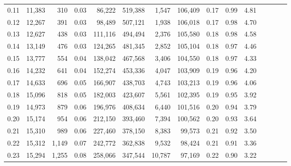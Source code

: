 \begin{tabular}{rrrcrrrrrrrrrrr}
0.11 &  11,383 &    310 &                                       0.03 &   86,222 &  519,388 &    1,547 &  106,409 &  0.17 &  0.99 &                         4.81 \\
0.12 &  12,267 &    391 &                                       0.03 &   98,489 &  507,121 &    1,938 &  106,018 &  0.17 &  0.98 &                         4.70 \\
0.13 &  12,627 &    438 &                                       0.03 &  111,116 &  494,494 &    2,376 &  105,580 &  0.18 &  0.98 &                         4.58 \\
0.14 &  13,149 &    476 &                                       0.03 &  124,265 &  481,345 &    2,852 &  105,104 &  0.18 &  0.97 &                         4.46 \\
0.15 &  13,777 &    554 &                                       0.04 &  138,042 &  467,568 &    3,406 &  104,550 &  0.18 &  0.97 &                         4.33 \\
0.16 &  14,232 &    641 &                                       0.04 &  152,274 &  453,336 &    4,047 &  103,909 &  0.19 &  0.96 &                         4.20 \\
0.17 &  14,633 &    696 &                                       0.05 &  166,907 &  438,703 &    4,743 &  103,213 &  0.19 &  0.96 &                         4.06 \\
0.18 &  15,096 &    818 &                                       0.05 &  182,003 &  423,607 &    5,561 &  102,395 &  0.19 &  0.95 &                         3.92 \\
0.19 &  14,973 &    879 &                                       0.06 &  196,976 &  408,634 &    6,440 &  101,516 &  0.20 &  0.94 &                         3.79 \\
0.20 &  15,174 &    954 &                                       0.06 &  212,150 &  393,460 &    7,394 &  100,562 &  0.20 &  0.93 &                         3.64 \\
0.21 &  15,310 &    989 &                                       0.06 &  227,460 &  378,150 &    8,383 &   99,573 &  0.21 &  0.92 &                         3.50 \\
0.22 &  15,312 &  1,149 &                                       0.07 &  242,772 &  362,838 &    9,532 &   98,424 &  0.21 &  0.91 &                         3.36 \\
0.23 &  15,294 &  1,255 &                                       0.08 &  258,066 &  347,544 &   10,787 &   97,169 &  0.22 &  0.90 &                         3.22 \\

\end{tabular}
